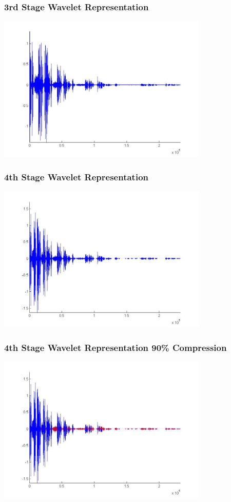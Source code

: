 \documentclass[10pt]{beamer}
\begin{document}
\begin{frame}
\frametitle{3rd Stage Wavelet Representation}
\includegraphics[height=7cm]{stage3}
\end{frame}

\begin{frame}
\frametitle{4th Stage Wavelet Representation}
\includegraphics[height=7cm]{stage4}
\end{frame}

\begin{frame}
\frametitle{4th Stage Wavelet Representation 90\% Compression}
\includegraphics[height=7cm]{stage4p9}
\end{frame}
\end{document}
